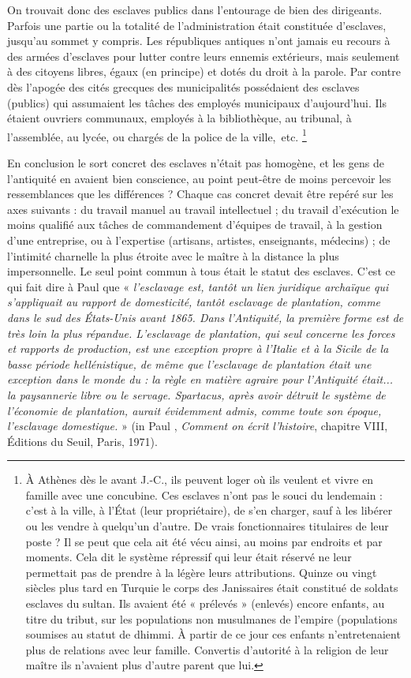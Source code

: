 On trouvait donc des esclaves publics dans l'entourage de bien des
dirigeants. Parfois une partie ou la totalité de l'administration était constituée
d'esclaves, jusqu'au sommet y compris. Les républiques antiques
n'ont jamais eu recours à des armées d'esclaves pour lutter contre leurs
ennemis extérieurs, mais seulement à des citoyens libres, égaux (en principe)
et dotés du droit à la parole. Par contre dès l'apogée des cités grecques
des municipalités possédaient des esclaves (publics) qui assumaient
les tâches des employés municipaux d'aujourd'hui. Ils étaient ouvriers
communaux, employés à la bibliothèque, au tribunal, à l'assemblée, au lycée,
ou chargés de la police de la ville,~etc.%
\footnote{À Athènes dès le  avant J.-C., ils peuvent loger où ils veulent et vivre en famille avec une concubine.
Ces esclaves n'ont pas le souci du lendemain : c'est à la ville, à l'État (leur propriétaire), de s'en charger, sauf à
les libérer ou les vendre à quelqu'un d'autre. De vrais fonctionnaires titulaires de leur poste ? Il se peut que cela ait
été vécu ainsi, au moins par endroits et par moments. Cela dit le système répressif qui leur était réservé ne leur
permettait pas de prendre à la légère leurs attributions. Quinze ou vingt siècles plus tard en Turquie le corps des
Janissaires était constitué de soldats esclaves du sultan. Ils avaient été « prélevés » (enlevés) encore enfants, au titre
du tribut, sur les populations non musulmanes de l'empire (populations soumises au statut de dhimmi. À partir de
ce jour ces enfants n'entretenaient plus de relations avec leur famille. Convertis d'autorité à la religion de leur maître
ils n'avaient plus d'autre parent que lui.}

En conclusion le sort concret des esclaves n'était pas homogène,
et les gens de l'antiquité en avaient bien conscience, au point peut-être de
moins percevoir les ressemblances que les différences ? Chaque cas
concret devait être repéré sur les axes suivants : du travail manuel au travail
intellectuel ; du travail d'exécution le moins qualifié aux tâches de
commandement d'équipes de travail, à la gestion d'une entreprise, ou à
l'expertise (artisans, artistes, enseignants, médecins) ; de l'intimité charnelle
la plus étroite avec le maître à la distance la plus impersonnelle. Le
seul point commun à tous était le statut des esclaves. C'est ce qui fait dire
à Paul  que « \emph{l'esclavage est, tantôt un lien juridique archaïque qui s'appliquait
au rapport de domesticité, tantôt esclavage de plantation, comme dans le sud
des États-Unis avant 1865. Dans l'Antiquité, la première forme est de très loin la
plus répandue. L'esclavage de plantation, qui seul concerne les forces et rapports de
production, est une exception propre à l'Italie et à la Sicile de la basse période hellénistique,
de même que l'esclavage de plantation était une exception dans le monde du  :
la règle en matière agraire pour l'Antiquité était... la paysannerie libre
ou le servage. Spartacus, après avoir détruit le système de l'économie de plantation,
aurait évidemment admis, comme toute son époque, l'esclavage domestique.} » (in Paul
, \emph{Comment on écrit l'histoire}, chapitre VIII, Éditions du Seuil, Paris,
1971).


